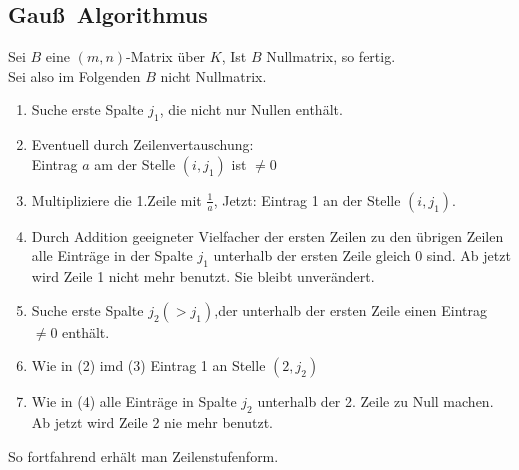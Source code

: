 \subsection[Algorithmus zur Transformation einer Matrix auf Zeilenstufenform mit elementaren Zeilenumformungen]{Gau\ss\ Algorithmus}
Sei $B$ eine $(m,n)$-Matrix über $K$, Ist $B$ Nullmatrix, so fertig.\\
Sei also im Folgenden $B$ nicht Nullmatrix.
\begin{enumerate}[(1)]
\item Suche erste Spalte $j_1$, die nicht nur Nullen enthält.
\item Eventuell durch Zeilenvertauschung:\\
Eintrag $a$ am der Stelle $(i,j_1)$ ist $\ne 0$
\item Multipliziere die 1.Zeile mit $\frac{1}{a}$, Jetzt: Eintrag 1 an der Stelle $(i,j_1)$.
\item Durch Addition geeigneter Vielfacher der ersten Zeilen zu den übrigen Zeilen alle Einträge in der Spalte $j_1$ unterhalb der ersten Zeile gleich 0 sind.
Ab jetzt wird Zeile 1 nicht mehr benutzt. Sie bleibt unverändert.
\item Suche erste Spalte $j_2 (> j_1)$,der unterhalb der ersten Zeile einen Eintrag $\ne 0$ enthält.
\item Wie in (2) imd (3) Eintrag 1 an Stelle $(2,j_2)$
\item Wie in (4) alle Einträge in Spalte $j_2$ unterhalb der 2. Zeile zu Null machen.\\
Ab jetzt wird Zeile 2 nie mehr benutzt.
\end{enumerate}
So fortfahrend erhält man Zeilenstufenform.
